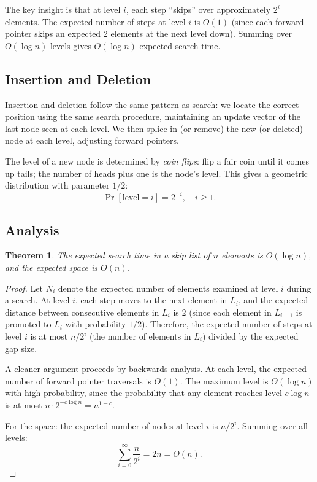 \documentclass[twoside,12pt]{book}
\theoremstyle{plain}
\newtheorem{theorem}{Theorem}[chapter]
\theoremstyle{definition}
\theoremstyle{remark}
\begin{document}
The key insight is that at level $i$, each step ``skips'' over approximately $2^i$ elements. The expected number of steps at level $i$ is $O(1)$ (since each forward pointer skips an expected 2 elements at the next level down). Summing over $O(\log n)$ levels gives $O(\log n)$ expected search time.

\subsection{Insertion and Deletion}

Insertion and deletion follow the same pattern as search: we locate the correct position using the same search procedure, maintaining an update vector of the last node seen at each level. We then splice in (or remove) the new (or deleted) node at each level, adjusting forward pointers.

The level of a new node is determined by \emph{coin flips}: flip a fair coin until it comes up tails; the number of heads plus one is the node's level. This gives a geometric distribution with parameter $1/2$:
\[
\Pr[\text{level} = i] = 2^{-i}, \quad i \geq 1.
\]

\subsection{Analysis}

\begin{theorem}\label{thm:skip-list}
The expected search time in a skip list of $n$ elements is $O(\log n)$, and the expected space is $O(n)$.
\end{theorem}

\begin{proof}
Let $N_i$ denote the expected number of elements examined at level $i$ during a search. At level $i$, each step moves to the next element in $L_i$, and the expected distance between consecutive elements in $L_i$ is $2$ (since each element in $L_{i-1}$ is promoted to $L_i$ with probability $1/2$). Therefore, the expected number of steps at level $i$ is at most $n/2^i$ (the number of elements in $L_i$) divided by the expected gap size.

A cleaner argument proceeds by backwards analysis. At each level, the expected number of forward pointer traversals is $O(1)$. The maximum level is $\Theta(\log n)$ with high probability, since the probability that any element reaches level $c \log n$ is at most $n \cdot 2^{-c \log n} = n^{1-c}$.

For the space: the expected number of nodes at level $i$ is $n/2^i$. Summing over all levels:
\[
\sum_{i=0}^{\infty} \frac{n}{2^i} = 2n = O(n).
\]
\end{proof}
\end{document}
